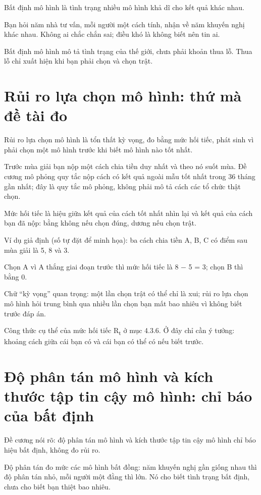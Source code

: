 Bất định mô hình là tình trạng nhiều mô hình khả dĩ cho kết quả khác nhau.

Bạn hỏi năm nhà tư vấn, mỗi người một cách tính, nhận về năm khuyến nghị khác nhau. Không ai chắc chắn sai; điều khó là không biết nên tin ai.

Bất định mô hình mô tả tình trạng của thế giới, chưa phải khoản thua lỗ. Thua lỗ chỉ xuất hiện khi bạn phải chọn và chọn trật.

\section{Rủi ro lựa chọn mô hình: thứ mà đề tài đo}

Rủi ro lựa chọn mô hình là tổn thất kỳ vọng, đo bằng mức hối tiếc, phát sinh vì phải chọn một mô hình trước khi biết mô hình nào tốt nhất.

Trước mùa giải bạn nộp một cách chia tiền duy nhất và theo nó suốt mùa. Đề cương mô phỏng quy tắc nộp cách có kết quả ngoài mẫu tốt nhất trong 36 tháng gần nhất; đây là quy tắc mô phỏng, không phải mô tả cách các tổ chức thật chọn.

Mức hối tiếc là hiệu giữa kết quả của cách tốt nhất nhìn lại và kết quả của cách bạn đã nộp: bằng không nếu chọn đúng, dương nếu chọn trật.

\begin{tcolorbox}[breakable]
Ví dụ giả định (số tự đặt để minh họa): ba cách chia tiền A, B, C có điểm sau mùa giải là 5, 8 và 3.

Chọn A vì A thắng giai đoạn trước thì mức hối tiếc là 8 − 5 = 3; chọn B thì bằng 0.
\end{tcolorbox}

Chữ “kỳ vọng” quan trọng: một lần chọn trật có thể chỉ là xui; rủi ro lựa chọn mô hình hỏi trung bình qua nhiều lần chọn bạn mất bao nhiêu vì không biết trước đáp án.

Công thức cụ thể của mức hối tiếc R\textsubscript{t} ở mục 4.3.6. Ở đây chỉ cần ý tưởng: khoảng cách giữa cái bạn có và cái bạn có thể có nếu biết trước.

\section{Độ phân tán mô hình và kích thước tập tin cậy mô hình: chỉ báo của bất định}

Đề cương nói rõ: độ phân tán mô hình và kích thước tập tin cậy mô hình chỉ báo hiệu bất định, không đo rủi ro.

Độ phân tán đo mức các mô hình bất đồng: năm khuyến nghị gần giống nhau thì độ phân tán nhỏ, mỗi người một đằng thì lớn. Nó cho biết tình trạng bất định, chưa cho biết bạn thiệt bao nhiêu.

